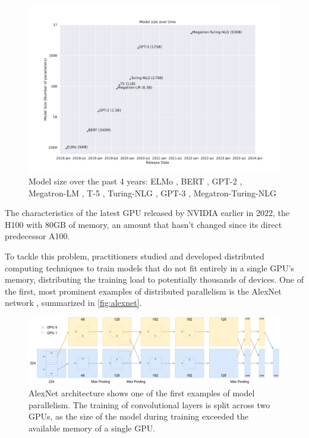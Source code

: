 \begin{figure}[h]
    \caption{Model size over the past 4 years: ELMo \cite{peters2018elmo}, BERT \cite{devlin2018bert}, GPT-2 \cite{radford2019language}, Megatron-LM \cite{shoeybi2019megatronlm}, T-5 \cite{raffael2019t5}, Turing-NLG \cite{microsoft2020turingnlg}, GPT-3 \cite{brown2020gpt3}, Megatron-Turing-NLG \cite{smith2022megatronturingnlg}}
    \label{fig:model-size-over-time}
    \includegraphics[width=\textwidth]{./figures/model-size-over-time.pdf}
\end{figure}

The characteristics of the latest GPU released by NVIDIA earlier in 2022, the H100 with 80GB of memory, an amount that hasn't changed since its direct predecessor A100.

To tackle this problem, practitioners studied and developed distributed computing techniques to train models that do not fit entirely in a single GPU's memory, distributing the training load to potentially thousands of devices.
One of the first, most prominent examples of distributed parallelism is the AlexNet network \cite{alexnet2012}, summarized in \autoref{fig:alexnet}.

\begin{figure}[h]
    \caption{AlexNet \cite{alexnet2012} architecture shows one of the first examples of model parallelism. The training of convolutional layers is split across two GPUs, as the size of the model during training exceeded the available memory of a single GPU.}
    \label{fig:alexnet}
    \includegraphics[width=\textwidth]{./figures/alexnet.pdf}
\end{figure}

